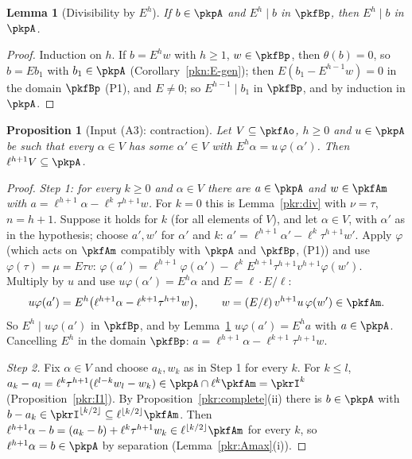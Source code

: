 \documentclass[10pt]{amsart}
\newtheorem{proposition}[theorem]{Proposition}
\newtheorem{lemma}[theorem]{Lemma}
\theoremstyle{definition}
\theoremstyle{remark}
\begin{document}
\begin{lemma}[Divisibility by $E^h$]\label{pkr:Ediv}
If $b\in\pkpA$ and $E^h\mid b$ in $\pkfBp$, then $E^h\mid b$ in $\pkpA$.
\end{lemma}

\begin{proof}
Induction on $h$. If $b=E^hw$ with $h\ge1$, $w\in\pkfBp$, then $\theta(b)=0$, so $b=Eb_1$ with
$b_1\in\pkpA$ (Corollary~\ref{pkn:E-gen}); then $E(b_1-E^{h-1}w)=0$ in the domain $\pkfBp$ (P1), and
$E\ne0$; so $E^{h-1}\mid b_1$ in $\pkfBp$, and by induction in $\pkpA$.
\end{proof}

\begin{proposition}[Input (A3): contraction]\label{pkr:I3}
Let $V\subseteq\pkfAo$, $h\ge0$ and $u\in\pkpA$ be such that every $\alpha\in V$ has some $\alpha'\in V$
with $E^h\alpha=u\,\varphi(\alpha')$. Then $\ell^{h+1}V\subseteq\pkpA$.
\end{proposition}

\begin{proof}
\emph{Step 1: for every $k\ge0$ and $\alpha\in V$ there are $a\in\pkpA$ and $w\in\pkfAm$ with
$a=\ell^{h+1}\alpha-\ell^k\tau^{h+1}w$.} For $k=0$ this is Lemma~\ref{pkr:div} with $\nu=\tau$,
$n=h+1$. Suppose it holds for $k$ (for all elements of $V$), and let $\alpha\in V$, with $\alpha'$ as
in the hypothesis; choose $a',w'$ for $\alpha'$ and $k$: $a'=\ell^{h+1}\alpha'-\ell^k\tau^{h+1}w'$.
Apply $\varphi$ (which acts on $\pkfAm$ compatibly with $\pkpA$ and $\pkfBp$, (P1)) and use
$\varphi(\tau)=\mu=E\tau v$:
$\varphi(a')=\ell^{h+1}\varphi(\alpha')-\ell^kE^{h+1}\tau^{h+1}v^{h+1}\varphi(w')$. Multiply by $u$ and
use $u\varphi(\alpha')=E^h\alpha$ and $E=\ell\cdot E/\ell$:
\[u\varphi(a')=E^h\bigl(\ell^{h+1}\alpha-\ell^{k+1}\tau^{h+1}w\bigr),\qquad w=(E/\ell)\,v^{h+1}u\,
\varphi(w')\in\pkfAm.\]
So $E^h\mid u\varphi(a')$ in $\pkfBp$, and by Lemma~\ref{pkr:Ediv} $u\varphi(a')=E^ha$ with $a\in\pkpA$.
Cancelling $E^h$ in the domain $\pkfBp$: $a=\ell^{h+1}\alpha-\ell^{k+1}\tau^{h+1}w$.

\emph{Step 2.} Fix $\alpha\in V$ and choose $a_k,w_k$ as in Step 1 for every $k$. For $k\le l$,
$a_k-a_l=\ell^k\tau^{h+1}(\ell^{l-k}w_l-w_k)\in\pkpA\cap\ell^k\pkfAm=\pkrI^k$
(Proposition~\ref{pkr:I1}). By Proposition~\ref{pkr:complete}(ii) there is $b\in\pkpA$ with
$b-a_k\in\pkrI^{\lfloor k/2\rfloor}\subseteq\ell^{\lfloor k/2\rfloor}\pkfAm$. Then
$\ell^{h+1}\alpha-b=(a_k-b)+\ell^k\tau^{h+1}w_k\in\ell^{\lfloor k/2\rfloor}\pkfAm$ for every $k$, so
$\ell^{h+1}\alpha=b\in\pkpA$ by separation (Lemma~\ref{pkr:Amax}(i)).
\end{proof}
\end{document}
